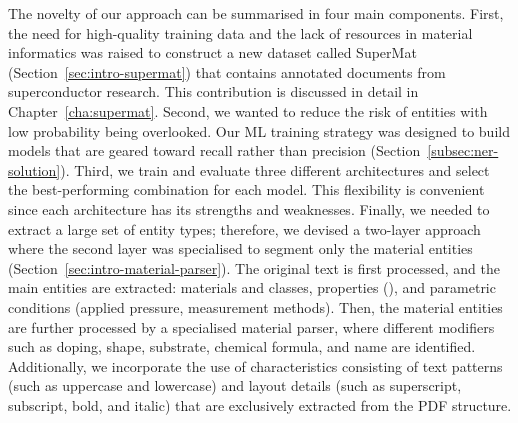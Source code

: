 The novelty of our approach can be summarised in four main components. 
First, the need for high-quality training data and the lack of resources in material informatics was raised to construct a new dataset called SuperMat (Section~\ref{sec:intro-supermat}) that contains annotated documents from superconductor research. This contribution is discussed in detail in Chapter~\ref{cha:supermat}.
Second, we wanted to reduce the risk of entities with low probability being overlooked. Our ML training strategy was designed to build models that are geared toward recall rather than precision (Section~\ref{subsec:ner-solution}).
Third, we train and evaluate three different architectures and select the best-performing combination for each model. This flexibility is convenient since each architecture has its strengths and weaknesses.  
Finally, we needed to extract a large set of entity types; therefore, we devised a two-layer approach where the second layer was specialised to segment only the material entities (Section~\ref{sec:intro-material-parser}).  
The original text is first processed, and the main entities are extracted: materials and classes, properties (\tc), and parametric conditions (applied pressure, measurement methods). 
Then, the material entities are further processed by a specialised material parser, where different modifiers such as doping, shape, substrate, chemical formula, and name are identified. 
Additionally, we incorporate the use of characteristics consisting of text patterns (such as uppercase and lowercase) and layout details (such as superscript, subscript, bold, and italic) that are exclusively extracted from the PDF structure.

